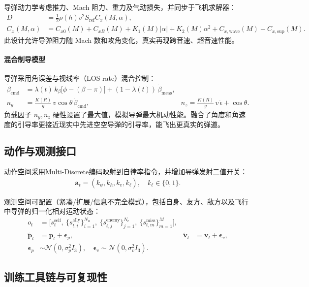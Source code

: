 \documentclass[11pt,a4paper]{article}
\begin{document}
导弹动力学考虑推力、Mach 阻力、重力及气动损失，并同步于飞机求解器：
\begin{align}
D &= \tfrac{1}{2}\rho(h)v^2 S_{\text{ref}} C_x(M,\alpha), \\
C_x(M,\alpha) &= C_{x0}(M) + C_{xB}(M) + K_1(M)|\alpha| + K_2(M)\alpha^2 + C_{x,\text{wave}}(M) + C_{x,\text{sup}}(M).
\end{align}
此设计允许导弹阻力随 Mach 数和攻角变化，真实再现跨音速、超音速性能。

\paragraph{混合制导模型}
导弹采用角误差与视线率（LOS-rate）混合控制：
\begin{align}
\dot{\beta}_{\text{cmd}} &= \lambda(t)\,k_\beta\big[\phi - (\beta - \pi)\big] + (1-\lambda(t))\,\dot{\beta}_{\text{meas}}, \\
n_y &= \frac{K(R)}{g}\,v\cos\theta\,\dot{\beta}_{\text{cmd}}, &
n_z = \frac{K(R)}{g}\,v\,\dot{\epsilon} + \cos\theta.
\end{align}
负载因子 $n_y,n_z$ 硬性设置了最大值，模拟导弹最大机动性能。融合了角度和角速度的引导率更接近现实中先进空空导弹的引导率，能飞出更真实的弹道。

\subsection{动作与观测接口}
动作空间采用Multi-Discrete编码映射到自律率指令，并增加导弹发射二值开关：
\begin{align}
\mathbf{a}_t = (k_\psi, k_h, k_v, k_\ell), \quad k_\ell\in\{0,1\}.
\end{align}

观测空间可配置（紧凑/扩展/信息不完全模式），包括自身、友方、敌方以及飞行中导弹的归一化相对运动状态：
\begin{align}
o_t &= \big[s^{\text{self}}_t,\ \{s^{\text{ally}}_{t,i}\}_{i=1}^{N_a},\ \{s^{\text{enemy}}_{t,j}\}_{j=1}^{N_e},\ \{s^{\text{miss}}_{t,m}\}_{m=1}^{M}\big], \\
\tilde{\mathbf{p}}_{t} &= \mathbf{p}_{t} + \boldsymbol{\epsilon}_p, & \tilde{\mathbf{v}}_{t} &= \mathbf{v}_{t} + \boldsymbol{\epsilon}_v, \\
\boldsymbol{\epsilon}_p &\sim \mathcal{N}(0,\sigma_p^2 I_3), \quad \boldsymbol{\epsilon}_v \sim \mathcal{N}(0,\sigma_v^2 I_3).
\end{align}

\subsection{训练工具链与可复现性}
\end{document}
